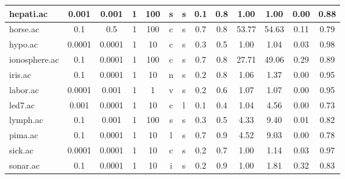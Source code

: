 \begin{table}[htbp]
\begin{tabular}{|l|c|c|c|c|c|c|c|c||c|c|c|c|}
		\hline
		hepati.ac      & 0.001    & 0.001       & 1              & 100      & s                   & s        & 0.1    & 0.8   & 1.00           & 1.00           & 0.00           & 0.88           \\
		\hline
		horse.ac       & 0.1      & 0.5         & 1              & 100      & c                   & s        & 0.7    & 0.8   & 53.77          & 54.63          & 0.11           & 0.79           \\
		\hline
		hypo.ac        & 0.0001   & 0.0001      & 1              & 10       & c                   & s        & 0.3    & 0.5   & 1.00           & 1.04           & 0.03           & 0.98           \\
		\hline
		ionosphere.ac  & 0.1      & 0.0001      & 1              & 100      & c                   & s        & 0.7    & 0.8   & 27.71          & 49.06          & 0.29           & 0.89           \\
		\hline
		iris.ac        & 0.1      & 0.0001      & 1              & 10       & n                   & s        & 0.2    & 0.8   & 1.06           & 1.37           & 0.00           & 0.95           \\
		\hline
		labor.ac       & 0.0001   & 0.001       & 1              & 1        & v                   & s        & 0.2    & 0.6   & 1.07           & 1.07           & 0.00           & 0.95           \\
		\hline
		led7.ac        & 0.001    & 0.0001      & 1              & 10       & c                   & l        & 0.1    & 0.4   & 1.04           & 4.56           & 0.00           & 0.73           \\
		\hline
		lymph.ac       & 0.1      & 0.001       & 1              & 100      & s                   & s        & 0.3    & 0.5   & 4.33           & 9.40           & 0.01           & 0.82           \\
		\hline
		pima.ac        & 0.1      & 0.0001      & 1              & 10       & l                   & s        & 0.7    & 0.9   & 4.52           & 9.03           & 0.00           & 0.78           \\
		\hline
		sick.ac        & 0.0001   & 0.0001      & 1              & 10       & c                   & s        & 0.2    & 0.7   & 1.00           & 1.14           & 0.03           & 0.97           \\
		\hline
		sonar.ac       & 0.1      & 0.0001      & 1              & 10       & i                   & s        & 0.2    & 0.9   & 1.00           & 1.81           & 0.32           & 0.83           \\

\end{tabular}
\end{table}
